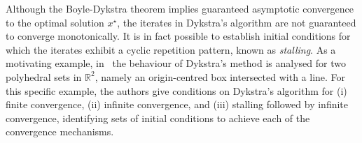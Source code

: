 
Although the Boyle-Dykstra theorem implies guaranteed asymptotic convergence to the optimal solution $x^\star$, the iterates in Dykstra's algorithm are not guaranteed to converge monotonically. It is in fact possible to establish initial conditions for which the iterates exhibit a cyclic repetition pattern, known as \emph{stalling}.
As a motivating example, in~\cite{DYKSTRASTALLING} the behaviour of Dykstra's method is analysed for two polyhedral sets in $\mathbb{R}^2$, namely an origin-centred box intersected with a line. For this specific example, the authors give conditions on Dykstra's algorithm for (i) finite convergence, (ii) infinite convergence, and (iii) stalling followed by infinite convergence, identifying sets of initial conditions to achieve each of the convergence mechanisms.